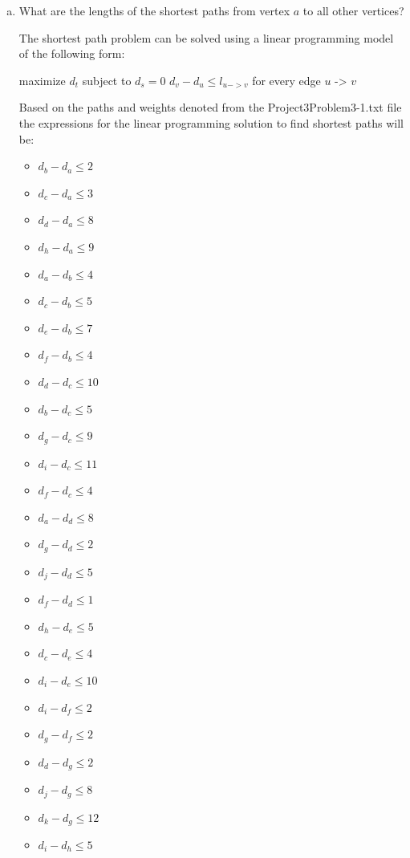 \documentclass[../report/main.tex]{subfiles}
\begin{document}
\begin{enumerate}[a)]
	\item What are the lengths of the shortest paths from vertex $a$ to all other vertices?

    The shortest path problem can be solved using a linear programming model of the following form:

    maximize $d_t$
    subject to $d_s = 0$
               $d_v - d_u \leq l_{u -> v}$ for every edge $u$ -> $v$

    Based on the paths and weights denoted from the Project3Problem3-1.txt file the expressions for the linear programming solution to find shortest paths will be:

    \begin{itemize}
      \item $d_b - d_a \leq 2$
      \item $d_c - d_a \leq 3$
      \item $d_d - d_a \leq 8$
      \item $d_h - d_a \leq 9$
      \item $d_a - d_b \leq 4$
      \item $d_c - d_b \leq 5$
      \item $d_e - d_b \leq 7$
      \item $d_f - d_b \leq 4$
      \item $d_d - d_c \leq 10$
      \item $d_b - d_c \leq 5$
      \item $d_g - d_c \leq 9$
      \item $d_i - d_c \leq 11$
      \item $d_f - d_c \leq 4$
      \item $d_a - d_d \leq 8$
      \item $d_g - d_d \leq 2$
      \item $d_j - d_d \leq 5$
      \item $d_f - d_d \leq 1$
      \item $d_h - d_e \leq 5$
      \item $d_c - d_e \leq 4$
      \item $d_i - d_e \leq 10$
      \item $d_i - d_f \leq 2$
      \item $d_g - d_f \leq 2$
      \item $d_d - d_g \leq 2$
      \item $d_j - d_g \leq 8$
      \item $d_k - d_g \leq 12$
      \item $d_i - d_h \leq 5$

\end{itemize}
\end{enumerate}
\end{document}
